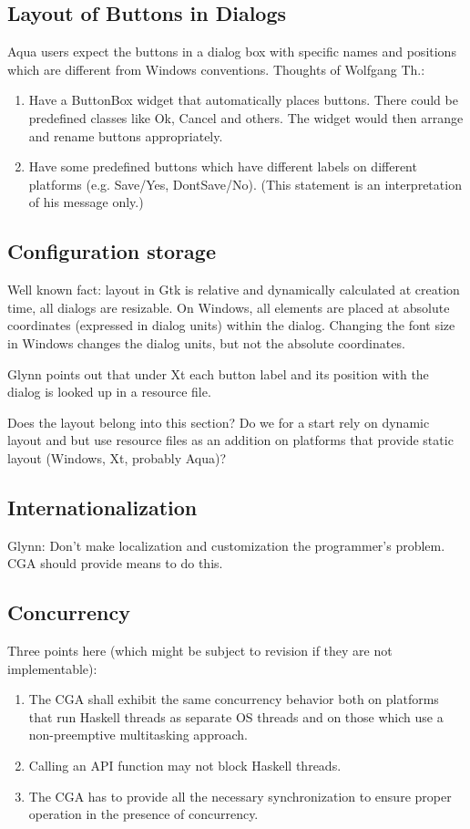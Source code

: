 \documentclass{article}
\begin{document}
\subsection{Layout of Buttons in Dialogs}
Aqua users expect the buttons in a dialog box with specific names and
positions which are different from Windows conventions. Thoughts of
Wolfgang Th.:

\begin{enumerate}
\item Have a ButtonBox widget that automatically places buttons. There
  could be predefined classes like Ok, Cancel and others. The widget
  would then arrange and rename buttons appropriately.
\item Have some predefined buttons which have different labels on
  different platforms (e.g. Save/Yes, DontSave/No). (This statement is
  an interpretation of his message only.)
\end{enumerate}

\subsection{Configuration storage}
Well known fact: layout in Gtk is relative and dynamically calculated
at creation time, all dialogs are resizable. On Windows, all elements
are placed at absolute coordinates (expressed in dialog units) within
the dialog. Changing the font size in Windows changes the dialog
units, but not the absolute coordinates.

Glynn points out that under Xt each button label and its position with
the dialog is looked up in a resource file.

Does the layout belong into this section? Do we for a start rely on
dynamic layout and but use resource files as an addition on platforms
that provide static layout (Windows, Xt, probably Aqua)?


\subsection{Internationalization}
Glynn: Don't make localization and customization the
programmer's problem. CGA should provide means to do this.

\subsection{Concurrency}
Three points here (which might be subject to revision if they are not implementable):
\begin{enumerate}
\item The CGA shall exhibit the same concurrency behavior both on
platforms that run Haskell threads as separate OS threads and on those
which use a non-preemptive multitasking approach.
\item Calling an API function may not block Haskell threads.
\item The CGA has to provide all the necessary synchronization to
ensure proper operation in the presence of concurrency.
\end{enumerate}
\end{document}
